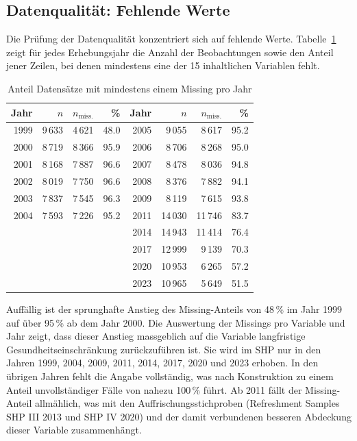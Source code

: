 
\subsection{Datenqualität: Fehlende Werte}
\label{subsec:datenqualitaet}

Die Prüfung der Datenqualität konzentriert sich auf fehlende Werte. Tabelle~\ref{tab:missing}
zeigt für jedes Erhebungsjahr die Anzahl der Beobachtungen sowie den Anteil jener Zeilen,
bei denen mindestens eine der 15 inhaltlichen Variablen fehlt.

\begin{table}[h]
\centering
\caption{Anteil Datensätze mit mindestens einem Missing pro Jahr}
\label{tab:missing}
\begin{tabular}{rrrr@{\hspace{2em}}rrrr}
\toprule
Jahr & $n$ & $n_{\text{miss.}}$ & \% &
Jahr & $n$ & $n_{\text{miss.}}$ & \% \\
\midrule
1999 & 9\,633  & 4\,621  & 48.0 & 2005 & 9\,055  & 8\,617  & 95.2 \\
2000 & 8\,719  & 8\,366  & 95.9 & 2006 & 8\,706  & 8\,268  & 95.0 \\
2001 & 8\,168  & 7\,887  & 96.6 & 2007 & 8\,478  & 8\,036  & 94.8 \\
2002 & 8\,019  & 7\,750  & 96.6 & 2008 & 8\,376  & 7\,882  & 94.1 \\
2003 & 7\,837  & 7\,545  & 96.3 & 2009 & 8\,119  & 7\,615  & 93.8 \\
2004 & 7\,593  & 7\,226  & 95.2 & 2011 & 14\,030 & 11\,746 & 83.7 \\
     &         &         &      & 2014 & 14\,943 & 11\,414 & 76.4 \\
     &         &         &      & 2017 & 12\,999 & 9\,139  & 70.3 \\
     &         &         &      & 2020 & 10\,953 & 6\,265  & 57.2 \\
     &         &         &      & 2023 & 10\,965 & 5\,649  & 51.5 \\
\bottomrule
\end{tabular}
\end{table}

Auffällig ist der sprunghafte Anstieg des Missing-Anteils von 48\,\% im Jahr 1999 auf
über 95\,\% ab dem Jahr 2000. Die Auswertung der Missings pro Variable und Jahr zeigt,
dass dieser Anstieg massgeblich auf die Variable langfristige Gesundheitseinschränkung
zurückzuführen ist. Sie wird im SHP nur in den Jahren 1999, 2004, 2009, 2011, 2014,
2017, 2020 und 2023 erhoben. In den übrigen Jahren fehlt die Angabe vollständig, was
nach Konstruktion zu einem Anteil unvollständiger Fälle von nahezu 100\,\% führt.
Ab 2011 fällt der Missing-Anteil allmählich, was mit den Auffrischungsstichproben
(Refreshment Samples SHP III 2013 und SHP IV 2020) und der damit
verbundenen besseren Abdeckung dieser Variable zusammenhängt.

